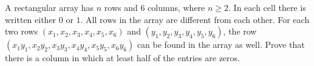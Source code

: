 A rectangular array has $ n$ rows and $ 6$ columns, where $ n \geq 2$. In each cell there is written either $ 0$ or $ 1$. All rows in the array are different from each other. For each two rows $ (x_{1},x_{2},x_{3},x_{4},x_{5},x_{6})$ and $ (y_{1},y_{2},y_{3},y_{4},y_{5},y_{6})$,  the row $ (x_{1}y_{1},x_{2}y_{2},x_{3}y_{3},x_{4}y_{4},x_{5}y_{5},x_{6}y_{6})$ can be found in the array as well. Prove that there is a column in which at least half of the entries are zeros.